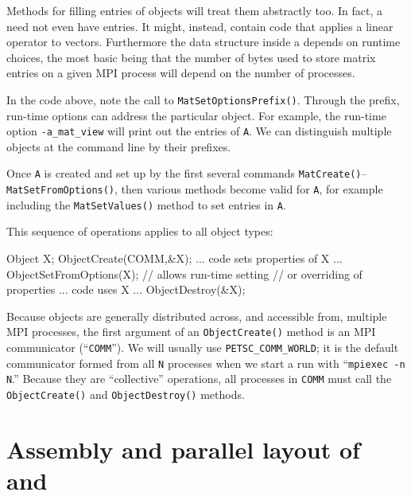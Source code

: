 Methods for filling entries of \pMat objects will treat them abstractly too.  In fact, a \pMat need not even have entries.  It might, instead, contain code that applies a linear operator to vectors.  Furthermore the data structure inside a \pMat depends on runtime choices, the most basic being that the number of bytes used to store matrix entries on a given MPI process will depend on the number of processes.

In the code above, note the call to \texttt{MatSetOptionsPrefix()}.  Through the prefix, run-time options can address the particular \pMat object.  For example, the run-time option \texttt{-a\_mat\_view} will print out the entries of \texttt{A}.  We can distinguish multiple \pMat objects at the command line by their prefixes.

Once \pMat \texttt{A} is created and set up by the first several commands \texttt{MatCreate()}--\texttt{MatSetFromOptions()}, then various methods become valid for \texttt{A}, for example including the \texttt{MatSetValues()} method to set entries in \texttt{A}.
 
This sequence of operations applies to all \PETSc object types:
\begin{code}
Object X;
ObjectCreate(COMM,&X);
... code sets properties of X ...
ObjectSetFromOptions(X);  // allows run-time setting
                          // or overriding of properties
... code uses X ...
ObjectDestroy(&X);
\end{code}
Because \PETSc objects are generally distributed across, and accessible from, multiple MPI processes, the first argument of an \texttt{ObjectCreate()} method is an MPI communicator (``\texttt{COMM}'').  We will usually use \texttt{PETSC\_COMM\_WORLD}; it is the default communicator formed from all \texttt{N} processes when we start a run with ``\texttt{mpiexec -n N}.''  Because they are ``collective'' operations, all processes in \texttt{COMM} must call the \texttt{ObjectCreate()} and  \texttt{ObjectDestroy()} methods.


\section{Assembly and parallel layout of \pVecs and \pMats}

